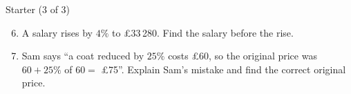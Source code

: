 \documentclass{beamer}
\newcommand{\ashow}[1]{\uncover<2->{\textcolor{red}{\small #1}}}
\newcommand{\tightlist}{%
  \setlength{\itemsep}{0pt}\setlength{\parskip}{0pt}\setlength{\topsep}{0pt}%
}
\newenvironment{ealglossed}{\par\linespread{2.1}\selectfont\ignorespaces}{\par}
\begin{document}
\begin{frame}[t]{Starter (3 of 3)}
\begin{ealglossed}
\vspace{-1.8em}
\footnotesize
\begin{enumerate}\setcounter{enumi}{5}\tightlist
  \item A salary rises by $4\%$ to \pounds33\,280. Find the salary before the rise.
        \ashow{$33\,280\div1.04=$ \pounds32\,000}
  \item Sam says ``a coat reduced by $25\%$ costs \pounds60, so the original price was
        $60+25\%$ of $60=$ \pounds75''. Explain Sam's mistake and find the correct original price.
        \ashow{The $25\%$ was taken off the original price, not off \pounds60. \pounds60 is $75\%$, so $60\div0.75=$ \pounds80.}
\end{enumerate}
\end{ealglossed}
\end{frame}
\end{document}
